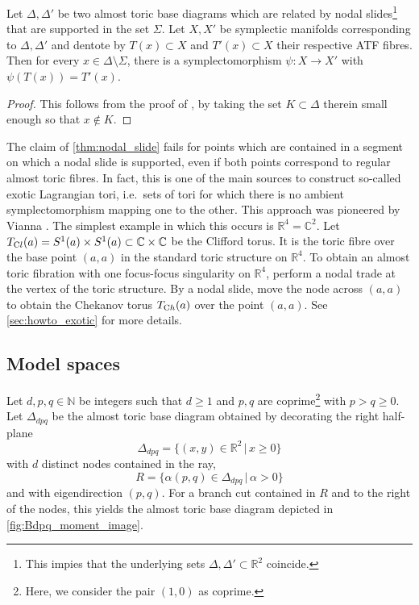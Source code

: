 \documentclass[12pt,a4paper,draft]{scrartcl}
\begin{document}
\begin{lemma}
    \label{thm:nodal_slide}
    Let $\Delta, \Delta'$ be two almost toric base diagrams which are related by nodal slides\footnote{This impies that the underlying sets $\Delta, \Delta' \subset \mathbb{R}^2$ coincide.} that are supported in the set $\Sigma$. Let $X,X'$ be symplectic manifolds corresponding to $\Delta,\Delta'$ and dentote by $T(x) \subset X$ and $T'(x) \subset X$ their respective ATF fibres.
Then for every $x \in \Delta \setminus \Sigma$, there is a symplectomorphism $\psi \colon X \rightarrow X'$ with $\psi(T(x)) = T'(x)$.
\end{lemma}

\begin{proof}
    This follows from the proof of \cite[Theorem 8.10]{evans2021atfs}, by taking the set $K \subset \Delta$ therein small enough so that $x \notin K$.
\end{proof}

\begin{remark}
    \label{rk:slides_ray}
    The claim of \cref{thm:nodal_slide} fails for points which are contained in a segment on which a nodal slide is supported, even if both points correspond to regular almost toric fibres.
In fact, this is one of the main sources to construct so-called exotic Lagrangian tori, i.e.\ sets of tori for which there is no ambient symplectomorphism mapping one to the other.
This approach was pioneered by Vianna \cite{Via16,Via17}. The simplest example in which this occurs is $\mathbb{R}^4 = \mathbb{C}^2$. Let $T_{\text Cl}(a) = S^1(a) \times S^1(a) \subset \mathbb{C} \times \mathbb{C}$ be the Clifford torus.
It is the toric fibre over the base point $(a,a)$ in the standard toric structure on $\mathbb{R}^4$.
To obtain an almost toric fibration with one focus-focus singularity on $\mathbb{R}^4$, perform a nodal trade at the vertex of the toric structure.
By a nodal slide, move the node across $(a,a)$ to obtain the Chekanov torus $T_{\text Ch}(a)$ over the point $(a,a)$.
See \cref{sec:howto_exotic} for more details.
\end{remark}


\subsection{Model spaces}

Let $d,p,q \in \mathbb{N}$ be integers such that $d≥1$ and $p,q$ are coprime\footnote{Here, we consider the pair $(1,0)$ as coprime.} with $p>q≥0$.
Let $\Delta_{dpq}$ be the almost toric base diagram obtained by decorating the right half-plane
$$\Delta_{dpq} = \{ (x,y) \in \mathbb{R}^2 \, \vert \, x \geqslant 0 \}$$
with $d$ distinct nodes contained in the ray,
\begin{equation}
  \label{eqn:eigenline}
  R = \{\alpha (p,q) \in \Delta_{dpq} \, \vert \, \alpha > 0 \}
\end{equation}
and with eigendirection $(p,q)$. For a branch cut contained in $R$ and to the right of the nodes, this yields the almost toric base diagram depicted in \cref{fig:Bdpq_moment_image}.
\end{document}
